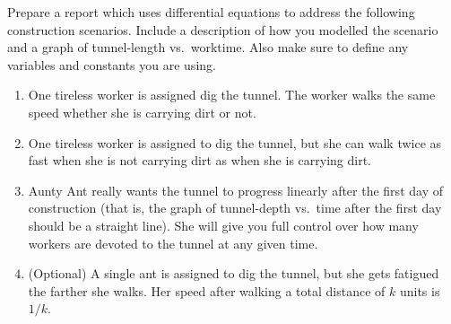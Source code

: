 \begin{exercises}
\begin{problist}
	Prepare a report which uses differential equations to address the following construction scenarios.  Include a
	description of how you modelled the scenario and a graph of tunnel-length vs.~worktime.
	Also make sure to define any variables and constants you are using.

	\begin{enumerate}
		\item One tireless worker is assigned dig the tunnel.  The worker walks the same speed
			whether she is carrying dirt or not.
		\item One tireless worker is assigned to dig the tunnel, but she can walk twice as fast
			when she is not carrying dirt as when she is carrying dirt.
		\item Aunty Ant really wants the tunnel to progress linearly after the first
			day of construction (that is, the graph of tunnel-depth vs.~time after
			the first day should be a straight line).  She will give you full control over
			how many workers are devoted to the tunnel at any given time.
		\item (Optional) A single ant is assigned to dig the tunnel, but she gets fatigued
			the farther she walks.  Her speed after walking a total distance of $k$ units is $1/k$.

	\end{enumerate}

	
	\end{problist}
\end{exercises}
